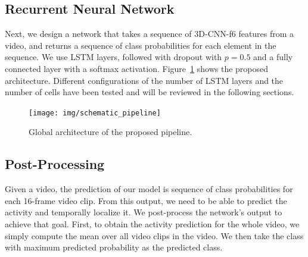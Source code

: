 \documentclass{article}
\begin{document}
\subsection{Recurrent Neural Network}
\label{sec:architecture}
Next, we design a network that takes a sequence of 3D-CNN-f6 features from a video, and returns a sequence of class probabilities for each element in the sequence. We use LSTM layers, followed with dropout with $p = 0.5$ and a fully connected layer with a softmax activation. Figure~\ref{fig:global_pipeline} shows the proposed architecture. Different configurations of the number of LSTM layers and the number of cells have been tested and will be reviewed in the following sections.

\begin{figure}[ht]
\centering
\texttt{[image: img/schematic\_pipeline]}
\caption{Global architecture of the proposed pipeline.}
\label{fig:global_pipeline}
\end{figure}





\subsection{Post-Processing}
Given a video, the prediction of our model is sequence of class probabilities for each 16-frame video clip. From this output, we need to be able to predict the activity  and temporally localize it. We post-process the network's output to achieve that goal. First, to obtain the activity prediction for the whole video, we simply compute the mean over all video clips in the video. We then take the class with maximum predicted probability as the predicted class.

\end{document}
